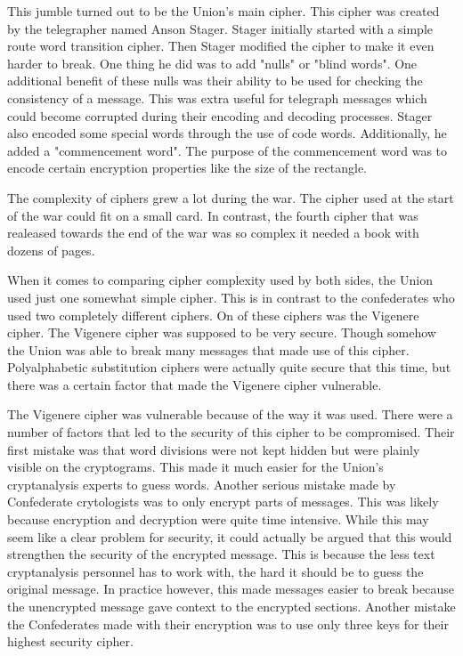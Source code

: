 \documentclass{article}
\begin{document}
    This jumble turned out to be the Union's main cipher. This cipher was
    created by the telegrapher named Anson Stager. Stager initially started
    with a simple route word transition cipher. Then Stager modified the cipher
    to make it even harder to break. One thing he did was to add "nulls" or "blind words".
    One additional benefit of these nulls was their ability to be used for checking
    the consistency of a message. This was extra useful for telegraph messages which
    could become corrupted during their encoding and decoding processes.
    Stager also encoded some special words through the use of code words.
    Additionally, he added a "commencement word". The purpose of the commencement
    word was to encode certain encryption properties like the size of the rectangle.

    The complexity of ciphers grew a lot during the war. The cipher used
    at the start of the war could fit on a small card. In contrast, the fourth cipher
    that was realeased towards the end of the war was so complex it needed
    a book with dozens of pages.

    When it comes to comparing cipher complexity used by both sides, the Union used
    just one somewhat simple cipher. This is in contrast to the confederates who
    used two completely different ciphers. On of these ciphers was the
    Vigenere cipher. The Vigenere cipher was supposed to be very secure.
    Though somehow the Union was able to break many messages that made use of this cipher.
    Polyalphabetic substitution ciphers were actually quite secure that this time,
    but there was a certain factor that made the Vigenere cipher vulnerable.

    The Vigenere cipher was vulnerable because of the way it was used.
    There were a number of factors that led to the security of this cipher to be
    compromised.
    Their first mistake was that word divisions were not kept hidden but were
    plainly visible on the cryptograms. This made it much easier for the Union's
    cryptanalysis experts to guess words.
    Another serious mistake made by Confederate crytologists was to only
    encrypt parts of messages. This was likely because encryption and decryption
    were quite time intensive.
    While this may seem like a clear problem for security, it could actually
    be argued that this would strengthen the security of the encrypted message.
    This is because the less text cryptanalysis personnel has to work with,
    the hard it should be to guess the original message.
    In practice however, this made messages easier to break because the unencrypted
    message gave context to the encrypted sections.
    Another mistake the Confederates made with their encryption was to use
    only three keys for their highest security cipher.
\end{document}
